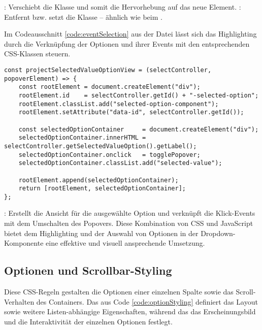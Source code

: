 : Verschiebt die Klasse  und somit die Hervorhebung auf das neue Element.
: Entfernt bzw. setzt die Klasse  – ähnlich wie beim . 

Im Codeausschnitt \ref{code:eventSelection} aus der Datei  lässt sich das Highlighting 
durch die Verknüpfung der Optionen und ihrer Events mit den entsprechenden CSS-Klassen steuern.

\begin{lstlisting}[style = htmlcssjs, caption = Event-Handling für die Auswahl einer Option, label = code:eventSelection]
const projectSelectedValueOptionView = (selectController, popoverElement) => {
    const rootElement = document.createElement("div");
    rootElement.id    = selectController.getId() + "-selected-option";
    rootElement.classList.add("selected-option-component");
    rootElement.setAttribute("data-id", selectController.getId());
    
    const selectedOptionContainer     = document.createElement("div");
    selectedOptionContainer.innerHTML = selectController.getSelectedValueOption().getLabel();
    selectedOptionContainer.onclick   = togglePopover;
    selectedOptionContainer.classList.add("selected-value");
    
    rootElement.append(selectedOptionContainer);
    return [rootElement, selectedOptionContainer];
}; 
\end{lstlisting}

: Erstellt die Ansicht für die ausgewählte Option und verknüpft die Klick-Events mit dem Umschalten des Popovers.
Diese Kombination von CSS und JavaScript bietet dem Highlighting und der Auswahl von Optionen in der Dropdown-Komponente eine effektive und visuell ansprechende Umsetzung.


\subsection{Optionen und Scrollbar-Styling}
\label{sec:sizeLayoutChanges}

Diese CSS-Regeln gestalten die Optionen einer einzelnen Spalte sowie das Scroll-Verhalten des Containers. 
Das  aus Code \ref{code:optionStyling} definiert das Layout sowie weitere Listen-abhängige Eigenschaften, 
während das  das Erscheinungsbild und die Interaktivität der einzelnen Optionen festlegt.

